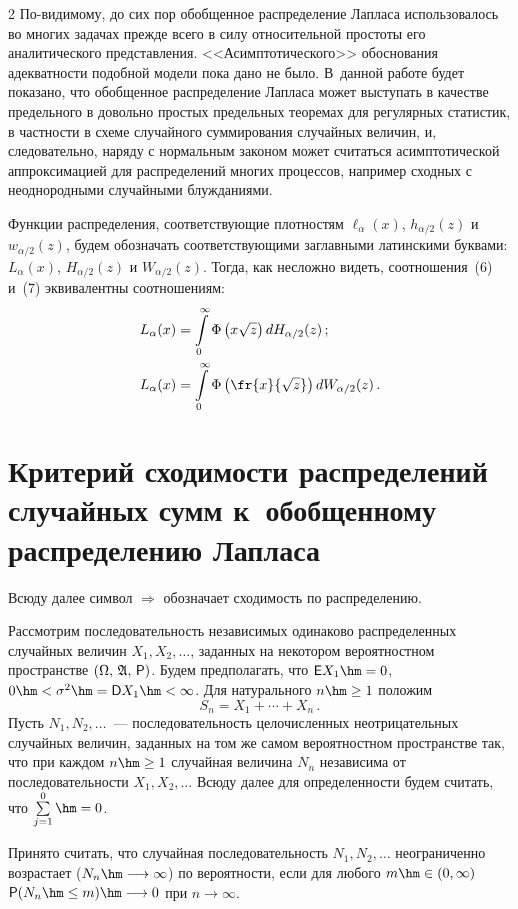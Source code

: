 \begin{multicols}{2}
По-видимому, до сих пор обобщенное распределение Лапласа
использовалось во многих задачах прежде всего в силу относительной
прос\-то\-ты его аналитического представления. <<Асимптотического>>
обоснования адекватности подобной модели пока дано не было. В~данной
работе будет показано, что обобщенное распределение Лапласа может
выступать в качестве предельного в довольно простых предельных
теоремах для регулярных статистик, в частности в схеме случайного
суммирования случайных величин, и, следовательно, наряду с
нормальным законом  может считаться асимптотической аппроксимацией
для распределений многих процессов, например сходных с неоднородными
случайными блужданиями.

Функции распределения, соответствующие плотностям
$\ell_{\alpha}(x)$, $h_{\alpha/2}(z)$ и $w_{\alpha/2}(z)$, будем
обозначать соответствующими заглавными латинскими буквами:
$L_{\alpha}(x)$, $H_{\alpha/2}(z)$ и $W_{\alpha/2}(z)$. Тогда, как
несложно видеть, соотношения~(6) и~(7) эквивалентны соотношениям:
\begin{align}
L_{\alpha}(x)&=\int\limits_0^{\infty}\Phi\left(x\sqrt{z}\right)dH_{\alpha/2}(z)\,;\label{e8-kor}\\
L_{\alpha}(x)&=\int\limits_0^{\infty}\Phi\left(\fr{x}{\sqrt{z}}\right)dW_{\alpha/2}(z)\,.\label{e9-kor}
\end{align}

\section{Критерий сходимости распределений случайных сумм к~обобщенному распределению Лапласа}

Всюду далее символ $\Longrightarrow$ обозначает сходимость по
распределению.

Рассмотрим последовательность независимых одинаково распределенных
случайных величин $X_1,X_2,\ldots$, заданных на некотором
вероятностном пространстве $(\Omega,\, \mathfrak{A},\,{\sf P})$.
Будем предполагать, что ${\sf E}X_1\hm=0$, $0\hm<\sigma^2\hm={\sf D}X_1\hm<\infty$. 
Для натурального $n\hm\ge1$ положим
$$
S_n=X_1+\cdots+X_n\,.
$$
Пусть $N_1,N_2,\ldots$~--- последовательность целочисленных
неотрицательных случайных величин, заданных на том же самом
вероятностном пространстве так, что при каждом $n\hm\ge1$ случайная
величина $N_n$ независима от последовательности $X_1,X_2,\ldots$
Всюду далее для определенности будем считать, что $\sum\limits_{j=1}^0\hm=0$.

Принято считать, что случайная последовательность $N_1,N_2,\ldots$
неограниченно возрастает ($N_n\hm\longrightarrow\infty$) по
вероятности, если для любого $m\hm\in(0,\infty)$ ${\sf P}(N_n\hm\le
m)\hm\longrightarrow 0$ при $n\to\infty$.


\end{multicols}
